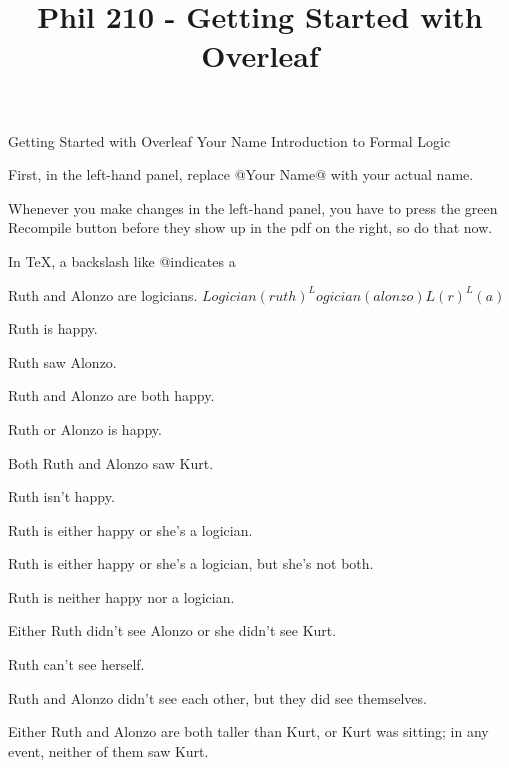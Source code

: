 
\title{Phil 210 - Getting Started with Overleaf}

\heading
Getting Started with Overleaf
Your Name
Introduction to Formal Logic
\endheading

First, in the left-hand panel, replace @Your Name@ with your actual name.

Whenever you make changes in the left-hand panel, you have to press the green Recompile button before they show up in the pdf on the right, so do that now.

In \TeX, a backslash like @\@ indicates a 

\problems
{}
Ruth and Alonzo are logicians.
	\answer
	$ Logician(ruth) ^ Logician(alonzo) $\OR$L(r)^L(a)$
	\endanswer

Ruth is happy.
	\answer
	$ $
	\endanswer

Ruth saw Alonzo.
	\answer
	$ $
	\endanswer

Ruth and Alonzo are both happy.
	\answer
	$ $
	\endanswer

Ruth or Alonzo is happy.
	\answer
	$ $
	\endanswer

Both Ruth and Alonzo saw Kurt.
	\answer
	$ $
	\endanswer

Ruth isn't happy.
	\answer
	$ $
	\endanswer

Ruth is either happy or she's a logician.
	\answer
	$ $
	\endanswer

Ruth is either happy or she's a logician, but she's not both.
	\answer
	$ $
	\endanswer

Ruth is neither happy nor a logician.
	\answer
	$ $
	\endanswer

Either Ruth didn't see Alonzo or she didn't see Kurt.
	\answer
	$ $
	\endanswer

Ruth can't see herself.
	\answer
	$ $
	\endanswer

Ruth and Alonzo didn't see each other, but they did see themselves.
	\answer
	$ $
	\endanswer

Either Ruth and Alonzo are both taller than Kurt, or Kurt was sitting; in any event, neither of them saw Kurt.
	\answer
	$ $
	\endanswer

\endproblems
\bye

